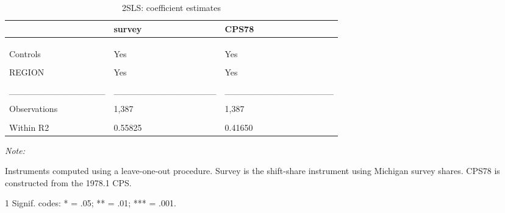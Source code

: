 \begin{table}

\caption{\label{tab:base:out:2sls:stage2}2SLS: coefficient estimates}
\centering
\begin{threeparttable}
\begin{tabular}[t]{lll}
\toprule
  & survey & CPS78\\
\midrule
\cellcolor{gray!6}{Dependent Var.:} & \cellcolor{gray!6}{RegInf} & \cellcolor{gray!6}{RegInf}\\
\addlinespace
 &  & \\
\addlinespace
\cellcolor{gray!6}{pe} & \cellcolor{gray!6}{0.3275* (0.1409)} & \cellcolor{gray!6}{0.5464** (0.1940)}\\
\addlinespace
Controls & Yes & Yes\\
\addlinespace
\cellcolor{gray!6}{Fixed-Effects:} & \cellcolor{gray!6}{----------------} & \cellcolor{gray!6}{-----------------}\\
\addlinespace
REGION & Yes & Yes\\
\addlinespace
\cellcolor{gray!6}{TIME} & \cellcolor{gray!6}{Yes} & \cellcolor{gray!6}{Yes}\\
\addlinespace
\_\_\_\_\_\_\_\_\_\_\_\_\_\_\_ & \_\_\_\_\_\_\_\_\_\_\_\_\_\_\_\_ & \_\_\_\_\_\_\_\_\_\_\_\_\_\_\_\_\_\\
\addlinespace
\cellcolor{gray!6}{S.E. type} & \cellcolor{gray!6}{Dris.-Kra. (L=4)} & \cellcolor{gray!6}{Drisc.-Kra. (L=4)}\\
\addlinespace
Observations & 1,387 & 1,387\\
\addlinespace
\cellcolor{gray!6}{R2} & \cellcolor{gray!6}{0.95440} & \cellcolor{gray!6}{0.93976}\\
\addlinespace
Within R2 & 0.55825 & 0.41650\\
\bottomrule
\end{tabular}
\begin{tablenotes}
\item \textit{Note: } 
\item Instruments computed using a leave-one-out procedure. Survey is the shift-share instrument using Michigan survey shares. CPS78 is constructed from the 1978.1 CPS.
\item[1] Signif. codes: * = .05; ** = .01; *** = .001.
\end{tablenotes}
\end{threeparttable}
\end{table}
